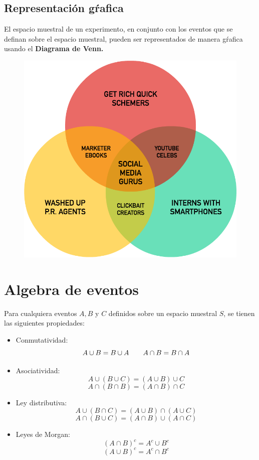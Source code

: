 \documentclass[12pt,twocolumn,a4paper]{report}
\begin{document}
\subsection*{Representación gŕafica}
El espacio muestral de un experimento, en conjunto con los eventos que se definan sobre el espacio muestral, pueden ser representados de manera gŕafica usando el \textbf{Diagrama de Venn.}
\begin{figure}[H]
\centering
\includegraphics[scale=0.3]{graficos/9.png}
\end{figure}

\section*{Algebra de eventos}
Para cualquiera eventos $A,B$ y $C$ definidos sobre un espacio muestral $S$, se tienen las siguientes propiedades:
\begin{itemize}
\setlength\itemsep{0.001cm}
\item{Conmutatividad:
$$
A \cup B = B \cup A \hspace{20px} A \cap B = B \cap A
$$}
\item{Asociatividad:
$$A \cup (B \cup C) = (A \cup B) \cup C$$
$$A \cap (B \cap B) = (A \cap B) \cap C$$}
\item{Ley distributiva:
$$A \cup (B \cap C) = (A \cup B) \cap (A \cup C)$$
$$A \cap (B \cup C) = (A \cap B) \cup (A \cap C)$$}
\item{Leyes de Morgan:
$$(A \cap B)^c = A^c \cup B^c$$
$$(A \cup B)^c = A^c \cap B^c$$}
\end{itemize}
\end{document}
